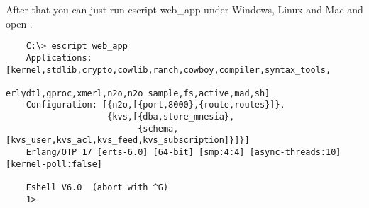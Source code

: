 After that you can just run escript web_app under Windows, Linux and
Mac and open .

\vspace{1\baselineskip}
\begin{lstlisting}
    C:\> escript web_app
    Applications: [kernel,stdlib,crypto,cowlib,ranch,cowboy,compiler,syntax_tools,
                   erlydtl,gproc,xmerl,n2o,n2o_sample,fs,active,mad,sh]
    Configuration: [{n2o,[{port,8000},{route,routes}]},
                    {kvs,[{dba,store_mnesia},
                          {schema,[kvs_user,kvs_acl,kvs_feed,kvs_subscription]}]}]
    Erlang/OTP 17 [erts-6.0] [64-bit] [smp:4:4] [async-threads:10] [kernel-poll:false]

    Eshell V6.0  (abort with ^G)
    1>
\end{lstlisting}
\vspace{1\baselineskip}

